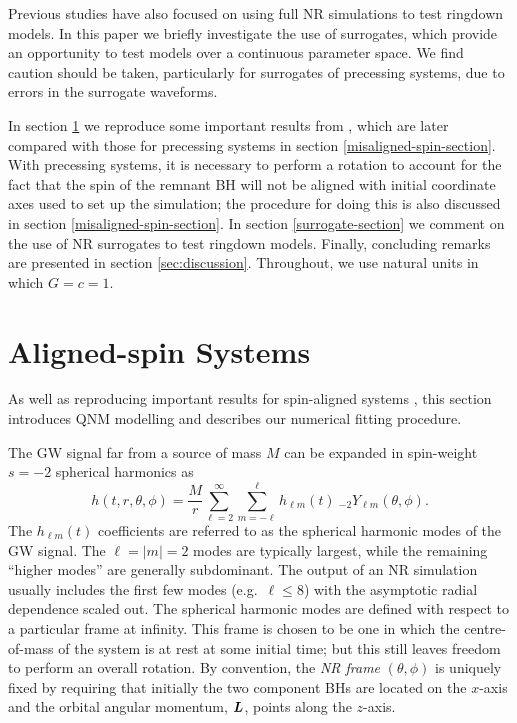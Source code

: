 Previous studies have also focused on using full NR simulations to test ringdown models. 
In this paper we briefly investigate the use of surrogates, which provide an opportunity to test models over a continuous parameter space. 
We find caution should be taken, particularly for surrogates of precessing systems, due to errors in the surrogate waveforms.

In section \ref{aligned-spin-section} we reproduce some important results from \cite{Giesler:2019uxc, Dhani:2020nik}, which are later compared with those for precessing systems in section \ref{misaligned-spin-section}. 
With precessing systems, it is necessary to perform a rotation to account for the fact that the spin of the remnant BH will not be aligned with initial coordinate axes used to set up the simulation; the procedure for doing this is also discussed in section \ref{misaligned-spin-section}. 
In section \ref{surrogate-section} we comment on the use of NR surrogates to test ringdown models. 
Finally, concluding remarks are presented in section \ref{sec:discussion}. 
Throughout, we use natural units in which $G=c=1$.

\section{Aligned-spin Systems}\label{aligned-spin-section}

As well as reproducing important results for spin-aligned systems \cite{Giesler:2019uxc, Dhani:2020nik}, this section introduces QNM modelling and describes our numerical fitting procedure. 

The GW signal far from a source of mass $M$ can be expanded in spin-weight $s=-2$ spherical harmonics as
\begin{equation}\label{YlmExpansion}
    h(t,r,\theta,\phi) = \frac{M}{r} \sum_{\ell = 2}^{\infty} \sum_{m = -\ell}^{\ell} h_{\ell m}(t) ~ {}_{-2}Y_{\ell m}(\theta, \phi).
\end{equation}
The $h_{\ell m}(t)$ coefficients are referred to as the spherical harmonic modes of the GW signal.
The ${\ell=|m|=2}$ modes are typically largest, while the remaining ``higher modes'' are generally subdominant.
The output of an NR simulation usually includes the first few modes (e.g.\ $\ell \leq 8$) with the asymptotic radial dependence scaled out.
The spherical harmonic modes are defined with respect to a particular frame at infinity.
This frame is chosen to be one in which the centre-of-mass of the system is at rest at some initial time; but this still leaves freedom to perform an overall rotation.
By convention, the \emph{NR frame} $(\theta,\phi)$ is uniquely fixed by requiring that initially the two component BHs are located on the $x$-axis and the orbital angular momentum, $\vb*{L}$, points along the $z$-axis.

